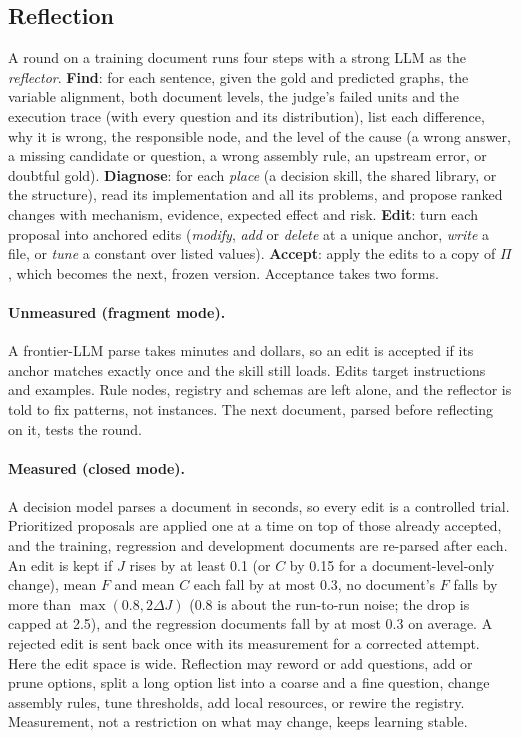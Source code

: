 \subsection{Reflection}
\label{sec:reflect}
A round on a training document runs four steps with a strong LLM as the \emph{reflector}. \textbf{Find}: for each sentence, given the gold and predicted graphs, the variable alignment, both document levels, the judge's failed units and the execution trace (with every question and its distribution), list each difference, why it is wrong, the responsible node, and the level of the cause (a wrong answer, a missing candidate or question, a wrong assembly rule, an upstream error, or doubtful gold). \textbf{Diagnose}: for each \emph{place} (a decision skill, the shared library, or the structure), read its implementation and all its problems, and propose ranked changes with mechanism, evidence, expected effect and risk. \textbf{Edit}: turn each proposal into anchored edits (\emph{modify}, \emph{add} or \emph{delete} at a unique anchor, \emph{write} a file, or \emph{tune} a constant over listed values). \textbf{Accept}: apply the edits to a copy of $\Pi$, which becomes the next, frozen version. Acceptance takes two forms.

\paragraph{Unmeasured (fragment mode).}
A frontier-LLM parse takes minutes and dollars, so an edit is accepted if its anchor matches exactly once and the skill still loads. Edits target instructions and examples. Rule nodes, registry and schemas are left alone, and the reflector is told to fix patterns, not instances. The next document, parsed before reflecting on it, tests the round.

\paragraph{Measured (closed mode).}
A decision model parses a document in seconds, so every edit is a controlled trial. Prioritized proposals are applied one at a time on top of those already accepted, and the training, regression and development documents are re-parsed after each. An edit is kept if $J$ rises by at least 0.1 (or $C$ by 0.15 for a document-level-only change), mean $F$ and mean $C$ each fall by at most 0.3, no document's $F$ falls by more than $\max(0.8, 2\Delta J)$ (0.8 is about the run-to-run noise; the drop is capped at 2.5), and the regression documents fall by at most 0.3 on average. A rejected edit is sent back once with its measurement for a corrected attempt. Here the edit space is wide. Reflection may reword or add questions, add or prune options, split a long option list into a coarse and a fine question, change assembly rules, tune thresholds, add local resources, or rewire the registry. Measurement, not a restriction on what may change, keeps learning stable.

